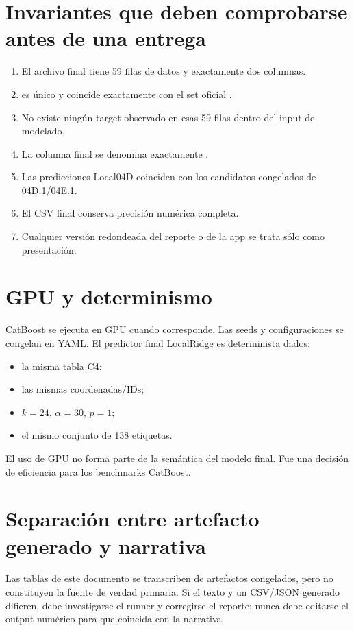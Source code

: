 \section{Invariantes que deben comprobarse antes de una entrega}

\begin{enumerate}
\item El archivo final tiene 59 filas de datos y exactamente dos columnas.
\item {} es único y coincide exactamente con el set oficial
.
\item No existe ningún target observado en esas 59 filas dentro del input de modelado.
\item La columna final se denomina exactamente .
\item Las predicciones Local04D coinciden con los candidatos congelados de 04D.1/04E.1.
\item El CSV final conserva precisión numérica completa.
\item Cualquier versión redondeada del reporte o de la app se trata sólo como presentación.
\end{enumerate}

\section{GPU y determinismo}

CatBoost se ejecuta en GPU cuando corresponde. Las seeds y configuraciones se congelan en YAML.
El predictor final LocalRidge es determinista dados:
\begin{itemize}
\item la misma tabla C4;
\item las mismas coordenadas/IDs;
\item $k=24$, $\alpha=30$, $p=1$;
\item el mismo conjunto de 138 etiquetas.
\end{itemize}

El uso de GPU no forma parte de la semántica del modelo final. Fue una decisión de eficiencia
para los benchmarks CatBoost.

\section{Separación entre artefacto generado y narrativa}

Las tablas de este documento se transcriben de artefactos congelados, pero no constituyen la
fuente de verdad primaria. Si el texto y un CSV/JSON generado difieren, debe investigarse el
runner y corregirse el reporte; nunca debe editarse el output numérico para que coincida con la
narrativa.


